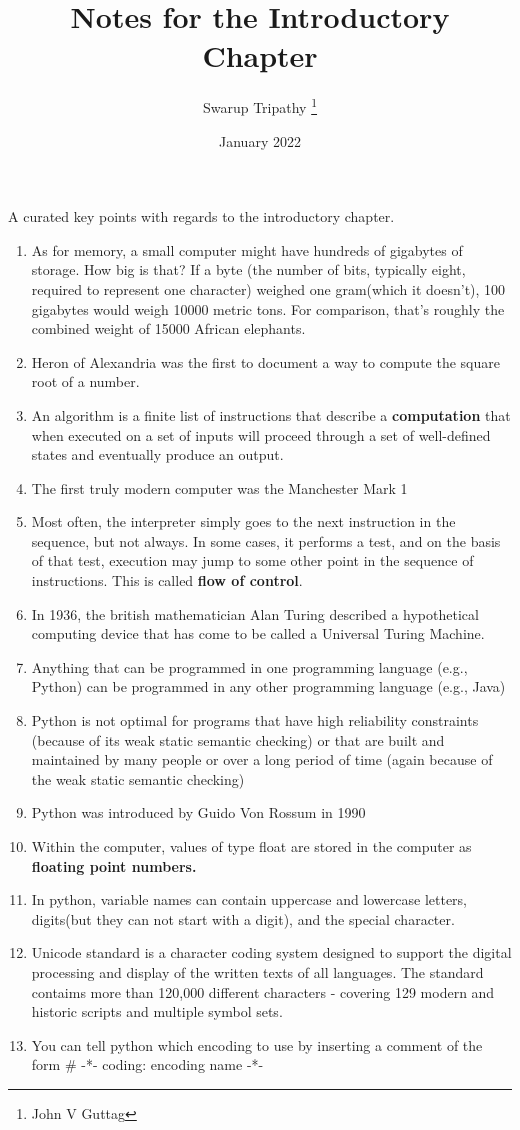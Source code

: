 \documentclass[12pt, letterpaper, twoside]{article}
\title{Notes for the Introductory Chapter}
\author{Swarup Tripathy \thanks{John V Guttag}}
\date{January 2022}
\begin{document}
\maketitle
A curated key points with regards to the introductory chapter. 
\begin{enumerate}
    \item As for memory, a small computer might have hundreds of gigabytes of storage. How big is that? If a byte (the number of bits, typically eight, required to represent one character)
    weighed one gram(which it doesn't), 100 gigabytes would weigh 10000 metric tons. For comparison, that's roughly the combined weight of 15000 African elephants.
    \item Heron of Alexandria was the first to document a way to compute the square root of a number.
    \item An algorithm is a finite list of instructions that describe a \textbf{computation} that when executed on a set of inputs will proceed through a set of well-defined states and 
    eventually produce an output.
    \item The first truly modern computer was the Manchester Mark 1
    \item Most often, the interpreter simply goes to the next instruction in the sequence, but not always. In some cases, it performs a test, and on the basis of that test, execution may jump
    to some other point in the sequence of instructions. This is called \textbf{flow of control}.
    \item In 1936, the british mathematician Alan Turing described a hypothetical computing device that has come to be called a Universal Turing Machine.
    \item Anything that can be programmed in one programming language (e.g., Python) can be programmed in any other programming language  (e.g., Java)
    \item Python is not optimal for programs that have high reliability constraints (because of its weak static semantic checking) or that are built and maintained by many people or over a long 
    period of time (again because of the weak static semantic checking)
    \item Python was introduced by Guido Von Rossum in 1990
    \item Within the computer, values of type float are stored in the computer as \textbf{floating point numbers.}
    \item In python, variable names can contain uppercase and lowercase letters, digits(but they can not start with a digit), and the special character.
    \item Unicode standard is a character coding system designed to support the digital processing and display of the written texts of all languages. The standard contaims more than 120,000 different
    characters - covering 129 modern and historic scripts and multiple symbol sets.
    \item You can tell python which encoding to use by inserting a comment of the form # -*- coding: encoding name -*-
\end{enumerate}
\end{document}
